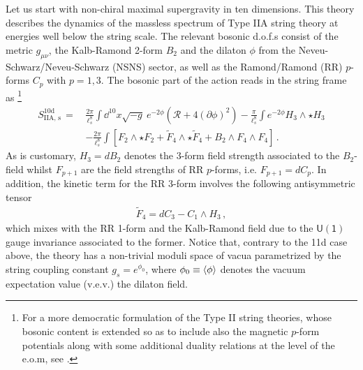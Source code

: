 Let us start with non-chiral maximal supergravity in ten dimensions. This theory describes the dynamics of the massless spectrum of Type IIA string theory at energies well below the string scale. The relevant bosonic d.o.f.s consist of the metric $g_{\mu \nu}$, the Kalb-Ramond 2-form $B_2$ and the dilaton $\phi$ from the Neveu-Schwarz/Neveu-Schwarz (NSNS) sector, as well as the Ramond/Ramond (RR) $p$-forms $C_p$ with $p=1,3$. The bosonic part of the action reads in the string frame as \cite{Polchinski:1998rr}\footnote{For a more democratic formulation of the Type II string theories, whose bosonic content is extended so as to include also the magnetic $p$-form potentials along with some additional duality relations at the level of the e.o.m, see \cite{Townsend:1995gp,Bergshoeff:2001pv}.}
%
\begin{equation}\label{eq:IIA10dstringframeaction}
\begin{aligned}
S_\text{IIA, s}^{\text{10d}}\, =\, &\frac{2\pi}{\ell_s^8} \int \dd^{10}x\sqrt{-g}\ e^{-2\phi} \left(\mathcal{R}+4(\partial \phi)^2\right)-\frac{\pi}{\ell_s^8}\int e^{-2\phi} H_3\wedge \star H_3 \\
&-\frac{2\pi}{\ell_s^8}\int \left[F_2 \wedge \star F_2 + \tilde F_4 \wedge \star \tilde F_4 + B_2\wedge F_4 \wedge F_4\right]\, . 
\end{aligned}
\end{equation}
%
As is customary, $H_3=dB_2$ denotes the 3-form field strength associated to the $B_2$-field whilst $F_{p+1}$ are the field strengths of RR $p$-forms, i.e. $F_{p+1}=dC_p$. In addition, the kinetic term for the RR 3-form involves the following antisymmetric tensor 
%
\begin{align}\label{eq:RR4formfieldstrength}
 \tilde F_4 = dC_3 - C_1\wedge  H_3\, , 
\end{align}
%
which mixes with the RR 1-form and the Kalb-Ramond field due to the $\mathsf{U(1)}$ gauge invariance associated to the former. Notice that, contrary to the 11d case above, the theory has a non-trivial moduli space of vacua parametrized by the string coupling constant $g_s= e^{\phi_0}$, where $\phi_0 \equiv \braket{\phi}$ denotes the vacuum expectation value (v.e.v.) the dilaton field.

